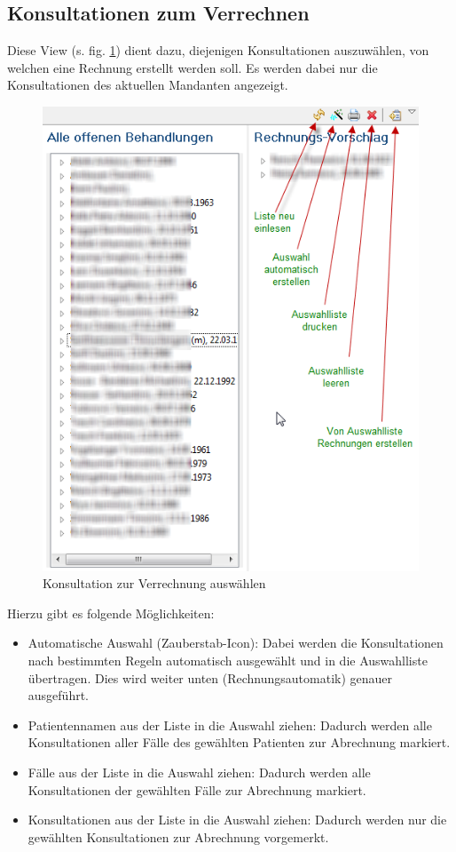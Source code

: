 \subsection{Konsultationen zum Verrechnen}
 Diese View (s. fig. \ref{fig:konsv}) dient dazu, diejenigen
Konsultationen
auszuwählen, von welchen eine Rechnung erstellt werden soll. Es werden dabei nur
die Konsultationen des aktuellen Mandanten angezeigt.
\begin{figure}[hb]
\includegraphics{images/konsv}
\caption{Konsultation zur Verrechnung auswählen}
\label {fig:konsv}
\end{figure}
Hierzu gibt es folgende Möglichkeiten:
\begin{itemize}
  \item Automatische Auswahl (Zauberstab-Icon): Dabei werden die Konsultationen nach bestimmten Regeln automatisch ausgewählt und in die Auswahlliste
  übertragen. Dies wird weiter unten (Rechnungsautomatik) genauer ausgeführt.
  \item Patientennamen aus der Liste in die Auswahl ziehen: Dadurch werden alle
  Konsultationen aller Fälle des gewählten Patienten zur Abrechnung markiert.
  \item Fälle aus der Liste in die Auswahl ziehen: Dadurch werden alle
  Konsultationen der gewählten Fälle zur Abrechnung markiert.
  \item Konsultationen aus der Liste in die Auswahl ziehen: Dadurch werden nur
  die gewählten Konsultationen zur Abrechnung vorgemerkt.
\end{itemize}
